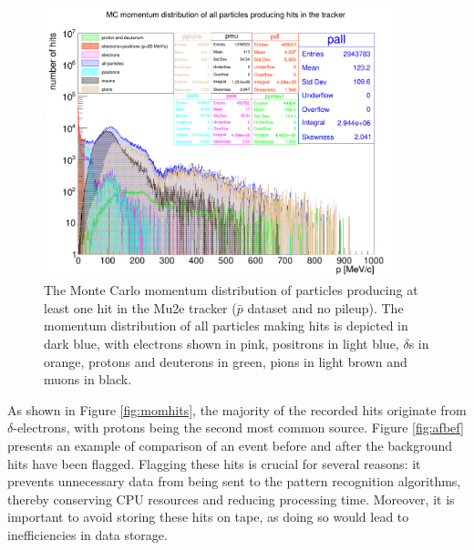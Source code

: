 \begin{figure}[!h]
    \centering
    \includegraphics[width =0.9\textwidth]{figures/png/Screenshot_20240815_124710.png}
\caption[Monte Carlo momentum distribution of particles producing hits in the Mu2e tracker ($\bar{p}$ dataset and no pileup).]{
   The Monte Carlo momentum distribution of particles producing at 
   least one hit in the Mu2e tracker ($\bar{p}$ dataset and no pileup). 
   The momentum distribution 
   of all particles making hits is depicted in dark blue, with electrons 
   shown in pink, positrons in light blue, $\delta$s in orange, protons and deuterons in green, pions in light brown and muons 
   in black. }
   \label{fig:pbar}
\end{figure}

As shown in Figure \ref{fig:momhits}, the majority of the recorded hits 
originate from $\delta$-electrons, with protons being the second most 
common source. Figure \ref{fig:afbef} presents an example of comparison of an 
event before and after the background hits have been flagged. 
Flagging these hits is crucial for several reasons: it prevents unnecessary 
data from being sent to the pattern recognition algorithms, thereby conserving 
CPU resources and reducing processing time. Moreover, it is important to avoid 
storing these hits on tape, as doing so would lead to inefficiencies in data storage.

